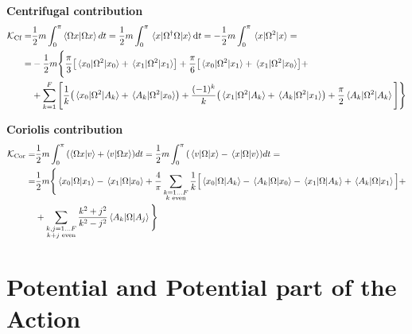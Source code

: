 \documentclass[a4paper, 12pt]{article}
\begin{document}
\textbf{Centrifugal contribution}
    \begin{align*}
    \mathcal K_\text{Cf} =& \frac 1 2 m\int_0^\pi \braket{\Omega x} dt = \frac 1 2 m \int_0^\pi\mel{x}{\Omega^\dagger \Omega }{x} \dd t  = -\frac 1 2 m \int_0^\pi \mel{x}{\Omega^2}{x} = \\
    =& -\frac 1 2 m \Bigg\{ \frac\pi 3\qty[\mel{x_0}{\Omega^2}{x_0} + \mel{x_1}{\Omega^2}{x_1}] + \frac \pi 6 \qty[ \mel{x_0}{\Omega^2}{x_1} + \mel{x_1}{\Omega^2}{x_0} ]  + \\ &+\sum_{k=1}^F\Bigg[\frac 1 k \qty(\mel{x_0}{\Omega^2}{A_k} + \mel{A_k}{\Omega^2}{x_0}) + \frac{(-1)^k}{k}\qty(\mel{x_1}{\Omega^2}{A_k} + \mel{A_k}{\Omega^2}{x_1}) +  \frac \pi 2 \mel{A_k}{\Omega^2}{A_k}\Bigg] \Bigg\}
   \end{align*}

   \vspace{0.5cm}

\textbf{Coriolis contribution}
   \begin{align*}
    \mathcal K_\text{Cor} =& \frac 1 2 m \int_0^\pi \qty(\braket{\Omega x}{v} + \braket{v}{\Omega x}) dt = \frac 1 2 m \int_0^\pi \qty(\mel{v}{\Omega}{x} - \mel{x}{\Omega}{v}) dt = \\
    =& \frac 1 2 m \Bigg\{ \mel{x_0}{\Omega}{x_1} - \mel{x_1}{\Omega}{x_0}  + \frac{4}{\pi}\sum_{\substack{k=1\ldots F \\ k \text{ even}}}\frac 1 k\Big[ \mel{x_0}{\Omega}{A_k} - \mel{A_k}{\Omega}{x_0} - \mel{x_1}{\Omega}{A_k} + \mel{A_k}{\Omega}{x_1} \Big] + \\
    &+\sum_{\substack{k,j = 1\ldots F \\ k+j \text{ even}}}\frac{k^2 + j^2}{k^2 - j^2} \mel{A_k}{\Omega}{A_j}\Bigg\}
   \end{align*}


\section{Potential and Potential part of the Action}
\end{document}
